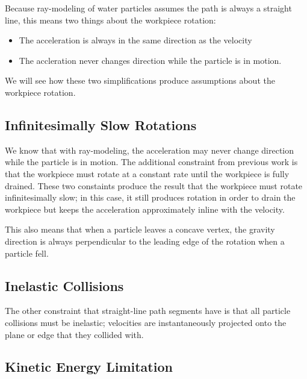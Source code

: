 Because ray-modeling of water particles assumes the path is always a straight line, this means two things about the workpiece rotation:

\begin{itemize}
	\item The acceleration is always in the same direction as the velocity
	\item The accleration never changes direction while the particle is in motion.
\end{itemize}

We will see how these two simplifications produce assumptions about the workpiece rotation.

	\subsection{Infinitesimally Slow Rotations}

We know that with ray-modeling, the acceleration may never change direction while the particle is in motion. The additional constraint from previous work is that the workpiece must rotate at a constant rate until the workpiece is fully drained. These two constaints produce the result that the workpiece must rotate infinitesimally slow; in this case, it still produces rotation in order to drain the workpiece but keeps the acceleration approximately inline with the velocity.

This also means that when a particle leaves a concave vertex, the gravity direction is always perpendicular to the leading edge of the rotation when a particle fell.


	\subsection{Inelastic Collisions}

The other constraint that straight-line path segments have is that all particle collisions must be inelastic; velocities are instantaneously projected onto the plane or edge that they collided with.


	\subsection{Kinetic Energy Limitation}

